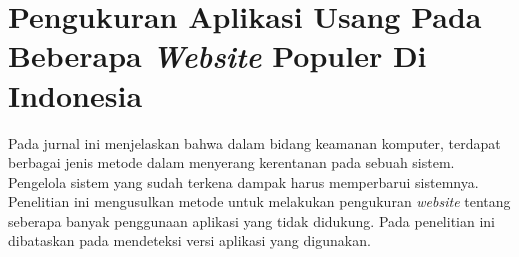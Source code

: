 


\section{Pengukuran Aplikasi Usang Pada Beberapa \textit{Website} Populer Di Indonesia\cite{pascal}}

Pada jurnal ini menjelaskan bahwa dalam bidang keamanan komputer, terdapat berbagai jenis metode dalam menyerang kerentanan pada sebuah sistem. Pengelola sistem yang sudah terkena dampak harus memperbarui sistemnya. Penelitian ini mengusulkan metode untuk melakukan pengukuran \textit{website} tentang seberapa banyak penggunaan aplikasi yang tidak didukung. Pada penelitian ini dibataskan pada mendeteksi versi aplikasi yang digunakan.

